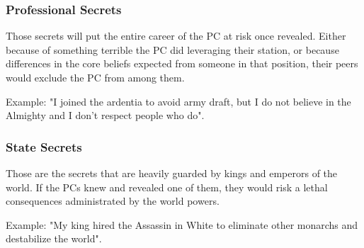 \subsubsection{Professional Secrets} 

Those secrets will put the entire career of the PC at risk once revealed. Either because of something terrible the PC did leveraging their station, or because differences in the core beliefs expected from someone in that position, their peers would exclude the PC from among them.

Example: "I joined the ardentia to avoid army draft, but I do not believe in the Almighty and I don't respect people who do".

\subsubsection{State Secrets}

Those are the secrets that are heavily guarded by kings and emperors of the world. If the PCs knew and revealed one of them, they would risk a lethal consequences administrated by the world powers.

Example: "My king hired the Assassin in White to eliminate other monarchs and destabilize the world".